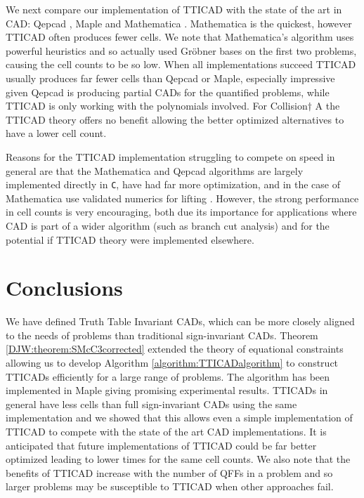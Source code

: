 \documentclass{article}
\begin{document}
We next compare our implementation of TTICAD with the state of the art in CAD: {\sc Qepcad} \cite{Brown03}, {\sc Maple} \cite{Chenetal2009d} and {\sc Mathematica} \cite{Strzebonski06, Strzebonski10}.  {\sc Mathematica} is the quickest, however TTICAD often produces fewer cells.  We note that {\sc Mathematica}'s algorithm uses powerful heuristics and so actually used Gr\"obner bases on the first two problems, causing the cell counts to be so low.  When all implementations succeed TTICAD usually produces far fewer cells than {\sc Qepcad} or {\sc Maple}, especially impressive given {\sc Qepcad} is producing partial CADs for the quantified problems, while TTICAD is only working with the polynomials involved.  
For Collision$\dagger$ A the TTICAD theory offers no benefit allowing the better optimized alternatives to have a lower cell count.
 
Reasons for the TTICAD implementation struggling to compete on speed in general are that the {\sc Mathematica} and {\sc Qepcad} algorithms are largely implemented directly in {\tt C}, have had far more optimization, and in the case of {\sc Mathematica} use validated numerics for lifting \cite{Strzebonski06}.  However, the strong performance in cell counts is very encouraging, both due its importance for applications where CAD is part of a wider algorithm (such as branch cut analysis) and for the potential if TTICAD theory were implemented elsewhere.



\section{Conclusions}
\label{sec:Conc}

We have defined Truth Table Invariant CADs, which can be more closely aligned to the needs of problems than traditional sign-invariant CADs.  Theorem \ref{DJW:theorem:SMcC3corrected} extended the theory of equational constraints allowing us to develop Algorithm \ref{algorithm:TTICADalgorithm} to construct TTICADs efficiently for a large range of problems.  The algorithm has been implemented in {\sc Maple} giving promising experimental results.  TTICADs in general have less cells than full sign-invariant CADs using the same implementation and we showed that this allows even a simple implementation of TTICAD to compete with the state of the art CAD implementations.  It is anticipated that future implementations of TTICAD could be far better optimized leading to lower times for the same cell counts.  We also note that the benefits of TTICAD increase with the number of QFFs in a problem and so larger problems may be susceptible to TTICAD when other approaches fail.
 
\end{document}
